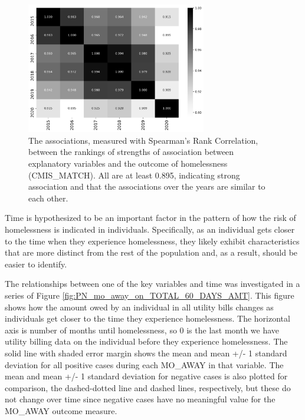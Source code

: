 \documentclass[12pt]{report}
\begin{document}
\begin{figure}[h]
    \centering
    \includegraphics[width=0.7\textwidth]{../img/corr_years.png}
    \caption[Correlation of variable correlation order by year]{The associations, measured with Spearman's Rank Correlation, between the rankings of strengths of association between explanatory variables and the outcome of homelessness (CMIS\_MATCH). All are at least 0.895, indicating strong association and that the associations over the years are similar to each other.}
    \label{fig:corr_years}
\end{figure}

Time is hypothesized to be an important factor in the pattern of how the risk of homelessness is indicated in individuals. Specifically, as an individual gets closer to the time when they experience homelessness, they likely exhibit characteristics that are more distinct from the rest of the population and, as a result, should be easier to identify. 

The relationships between one of the key variables and time was investigated in a series of Figure \ref{fig:PN_mo_away_on_TOTAL_60_DAYS_AMT}. This figure shows how the amount owed by an individual in all utility bills changes as individuals get closer to the time they experience homelessness. The horizontal axis is number of months until homelessness, so 0 is the last month we have utility billing data on the individual before they experience homelessness. The solid line with shaded error margin shows the mean and mean +/- 1 standard deviation for all positive cases during each MO\_AWAY in that variable. The mean and mean +/- 1 standard deviation for negative cases is also plotted for comparison, the dashed-dotted line and dashed lines, respectively, but these do not change over time since negative cases have no meaningful value for the MO\_AWAY outcome measure.
\end{document}
